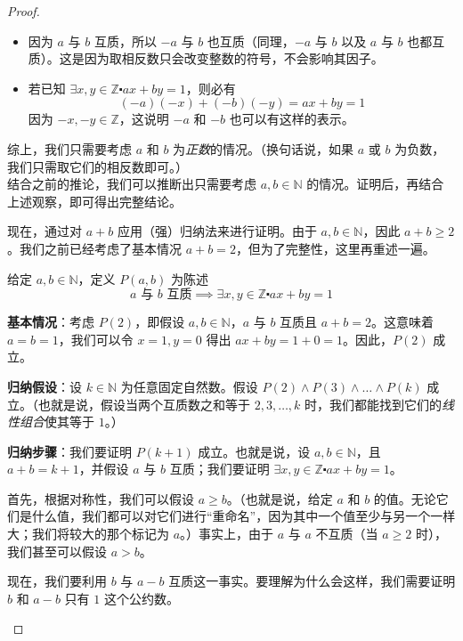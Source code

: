 \begin{proof}
\begin{tcolorbox}
            \begin{itemize}
                \item 因为 $a$ 与 $b$ 互质，所以 $-a$ 与 $b$ 也互质（同理，$-a$ 与 $b$ 以及 $a$ 与 $b$ 也都互质）。这是因为取相反数只会改变整数的符号，不会影响其因子。
                \item 若已知 $\exists x, y \in \mathbb{Z} \centerdot ax + by = 1$，则必有
                    \[(-a)(-x) + (-b)(-y) = ax + by = 1\]
                    因为 $-x,-y \in \mathbb{Z}$，这说明 $-a$ 和 $-b$ 也可以有这样的表示。
            \end{itemize}
            综上，我们只需要考虑 $a$ 和 $b$ 为\emph{正数}的情况。（换句话说，如果 $a$ 或 $b$ 为负数，我们只需取它们的相反数即可。）\\

            结合之前的推论，我们可以推断出只需要考虑 $a,b \in \mathbb{N}$ 的情况。证明后，再结合上述观察，即可得出完整结论。

            现在，通过对 $a + b$ 应用（强）归纳法来进行证明。由于 $a,b \in \mathbb{N}$，因此 $a + b \ge 2$。我们之前已经考虑了基本情况 $a + b = 2$，但为了完整性，这里再重述一遍。

            给定 $a,b \in \mathbb{N}$，定义 $P(a,b)$ 为陈述
            \[a \text{\ 与\ } b \text{\ 互质} \implies \exists x, y \in \mathbb{Z} \centerdot ax + by = 1\]

            \textbf{基本情况}：考虑 $P(2)$，即假设 $a,b \in \mathbb{N}$，$a$ 与 $b$ 互质且 $a+b=2$。这意味着 $a=b=1$，我们可以令 $x=1, y=0$ 得出 $ax + by = 1 + 0 = 1$。因此，$P(2)$ 成立。

            \textbf{归纳假设}：设 $k \in \mathbb{N}$ 为任意固定自然数。假设 $P(2) \land P(3) \land \dots \land P(k)$ 成立。（也就是说，假设当两个互质数之和等于 $2,3, \dots, k$ 时，我们都能找到它们的\emph{线性组合}使其等于 $1$。）

            \textbf{归纳步骤}：我们要证明 $P(k+1)$ 成立。也就是说，设 $a, b \in \mathbb{N}$，且 $a + b = k + 1$，并假设 $a$ 与 $b$ 互质；我们要证明 $\exists x, y \in \mathbb{Z} \centerdot ax + by = 1$。

            首先，根据对称性，我们可以假设 $a \ge b$。（也就是说，给定 $a$ 和 $b$ 的值。无论它们是什么值，我们都可以对它们进行``重命名''，因为其中一个值至少与另一个一样大；我们将较大的那个标记为 $a$。）事实上，由于 $a$ 与 $a$ 不互质（当 $a \ge 2$ 时），我们甚至可以假设 $a > b$。

            现在，我们要利用 $b$ 与 $a - b$ 互质这一事实。要理解为什么会这样，我们需要证明 $b$ 和 $a - b$ 只有 $1$ 这个公约数。


\end{tcolorbox}
\end{proof}
